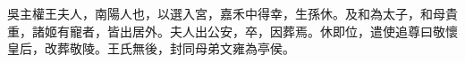 
\begin{pinyinscope}
吳主權王夫人，南陽人也，以選入宮，嘉禾中得幸，生孫休。及和為太子，和母貴重，諸姬有寵者，皆出居外。夫人出公安，卒，因葬焉。休即位，遣使追尊曰敬懷皇后，改葬敬陵。王氏無後，封同母弟文雍為亭侯。


\end{pinyinscope}